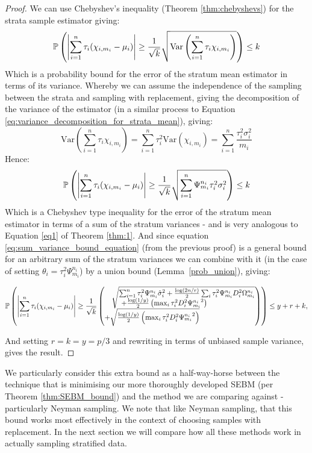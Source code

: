 \begin{proof}

We can use Chebyshev's inequality (Theorem \ref{thm:chebyshevs}) for the strata sample estimator giving:
$$ \operatorname{\mathbb{P}}\left(\left|\sum_{i=1}^n\tau_i(\chi_{i,m_i}-\mu_i)\right|\ge \frac{1}{\sqrt{k}}\sqrt{\text{Var}\left(\sum_{i=1}^n\tau_i\chi_{i,m_i}\right)}\right) \le k $$
Which is a probability bound for the error of the stratum mean estimator in terms of its variance.
Whereby we can assume the independence of the sampling between the strata and sampling with replacement, giving the decomposition of the variance of the estimator (in a similar process to Equation \ref{eq:variance_decomposition_for_strata_mean}), giving:
$$ \text{Var}\left(\sum_{i=1}^n\tau_i\chi_{i,m_i}\right) = \sum_{i=1}^n\tau_i^2\text{Var}(\chi_{i,m_i}) =  \sum_{i=1}^n\frac{\tau_i^2\sigma_i^2}{m_i} $$
Hence:
$$ \operatorname{\mathbb{P}}\left(\left|\sum_{i=1}^n\tau_i(\chi_{i,m_i}-\mu_i)\right|\ge \frac{1}{\sqrt{k}}\sqrt{\sum_{i=1}^n\Psi_{m_i}^{n_i}\tau_i^2\sigma_i^2}\right) \le k $$
Which is a Chebyshev type inequality for the error of the stratum mean estimator in terms of a sum of the stratum variances - and is very analogous to Equation \ref{eq1} of Theorem \ref{thm:1}.
And since equation \ref{eq:sum_variance_bound_equation} (from the previous proof) is a general bound for an arbitrary sum of the stratum variances we can combine with it (in the case of setting $\theta_i = \tau_i^2\Psi_{m_i}^{n_i}$) by a union bound (Lemma~\ref{prob_union}), giving:

$$
\pr\left(\left|\sum_{i=1}^n\tau_i(\chi_{i,m_i}-\mu_i)\right| \ge \frac{1}{\sqrt{k}}\left( \begin{matrix*}[l]\quad\sqrt{\begin{matrix*}[l]\sum_{i=1}^n\tau_i^2\Psi_{m_i}^{n_i}\hat{\sigma}_i^2+ \frac{\log(2n/r)}{2}\sum_i\tau_i^2\Psi_{m_i}^{n_i}D_i^2\Omega_{m_i}^{n_i} \\ ~+ \frac{\log(1/y)}{2}\left(\max_i\tau_i^2D_i^2{\Psi_{m_i}^{n_i}}^2\right)\end{matrix*}} \\ +\sqrt{\frac{\log(1/y)}{2}\left(\max_i\tau_i^2D_i^2{\Psi_{m_i}^{n_i}}^2\right)}\end{matrix*}\right)\right) \le y+r+k,
$$

And setting $ r=k=y=p/3 $ and rewriting in terms of unbiased sample variance, gives the result.

\end{proof}


We particularly consider this extra bound as a half-way-horse between the technique that is minimising our more thoroughly developed SEBM (per Theorem \ref{thm:SEBM_bound}) and the method we are comparing against - particularly Neyman sampling.
We note that like Neyman sampling, that this bound works most effectively in the context of choosing samples with replacement.
In the next section we will compare how all these methods work in actually sampling stratified data.

